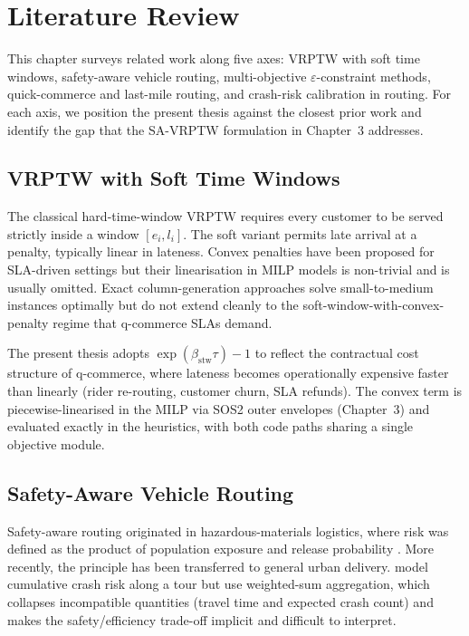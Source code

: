 \chapter{Literature Review}

This chapter surveys related work along five axes: VRPTW with soft
time windows, safety-aware vehicle routing, multi-objective
$\varepsilon$-constraint methods, quick-commerce and last-mile
routing, and crash-risk calibration in routing. For each axis, we
position the present thesis against the closest prior work and
identify the gap that the SA-VRPTW formulation in Chapter~3
addresses.

\section{VRPTW with Soft Time Windows}

The classical hard-time-window VRPTW \citep{solomon1987} requires
every customer to be served strictly inside a window $[e_i, l_i]$.
The soft variant \citep{koskosidis1992,fu2008} permits late arrival
at a penalty, typically linear in lateness. Convex penalties have
been proposed for SLA-driven settings \citep{taillard1997} but their
linearisation in MILP models is non-trivial and is usually omitted.
Exact column-generation approaches \citep{desrochers1992} solve
small-to-medium instances optimally but do not extend cleanly to the
soft-window-with-convex-penalty regime that q-commerce SLAs demand.

The present thesis adopts $\exp(\beta_{\text{stw}}\tau) - 1$ to
reflect the contractual cost structure of q-commerce, where lateness
becomes operationally expensive faster than linearly (rider
re-routing, customer churn, SLA refunds). The convex term is
piecewise-linearised in the MILP via SOS2 outer envelopes (Chapter~3)
and evaluated exactly in the heuristics, with both code paths sharing
a single objective module.

\section{Safety-Aware Vehicle Routing}

Safety-aware routing originated in hazardous-materials logistics,
where risk was defined as the product of population exposure and
release probability \citep{zografos2004,erkut1998}. More recently,
the principle has been transferred to general urban delivery.
\citet{hoseinzadeh2020} model cumulative crash risk along a tour but
use weighted-sum aggregation, which collapses incompatible quantities
(travel time and expected crash count) and makes the
safety/efficiency trade-off implicit and difficult to interpret.

